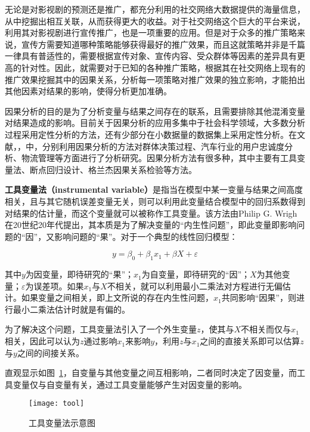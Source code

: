 无论是对影视剧的预测还是推广，都充分利用的社交网络大数据提供的海量信息，从中挖掘出相互关联，从而获得更大的收益。对于社交网络这个巨大的平台来说，利用其对影视剧进行宣传推广，也是一项重要的应用。但是对于众多的推广策略来说，宣传方需要知道哪种策略能够获得最好的推广效果，而且这就策略并非是千篇一律具有普适性的，需要根据宣传对象、宣传内容、受众群体等因素的差异具有更高的针对性。因此，就需要对于已知的各种推广策略，根据其在社交网络上现有的推广效果挖掘其中的因果关系，分析每一项策略对推广效果的独立影响，才能拍出其他因素对结果的影响，使得分析更加准确。

因果分析的目的是为了分析变量与结果之间存在的联系，且需要排除其他混淆变量对结果造成的影响。目前关于因果分析的应用多集中于社会科学领域，大多数分析过程采用定性分析的方法，还有少部分在小数据量的数据集上采用定性分析。在文献\cite{lin2008causal}，\cite{bauer1997method}，\cite{giessmann2010complexity}中，分别利用因果分析的方法对群体决策过程、汽车行业的用户忠诚度分析、物流管理等方面进行了分析研究。因果分析方法有很多种，其中主要有工具变量法、断点回归设计、格兰杰因果关系检验等方法。


\textbf{工具变量法（instrumental variable）}是指当在模型中某一变量与结果之间高度相关，且与其它随机误差变量无关，则可以利用此变量结合模型中的回归系数得到对结果的估计量，而这个变量就可以被称作工具变量\cite{工具}。该方法由Philip G. Wrigh在20世纪20年代提出\cite{stock2003retrospectives}，其本质是为了解决变量的“内生性问题”，即此变量即影响问题的“因”，又影响问题的“果”\cite{陈云松2012逻辑}。对于一个典型的线性回归模型：

\begin{equation}
y = \beta_0 + \beta_1x_1 + \beta X +  \varepsilon
\end{equation}

其中$y$为因变量，即待研究的“果”；$x_1$为自变量，即待研究的“因”；$X$为其他变量；$\varepsilon$为误差项。如果$x_1$与$X$不相关，就可以利用最小二乘法对方程进行无偏估计。如果变量之间相关，即上文所说的存在内生性问题，$x_1$共同影响“因果”，则进行最小二乘法估计时就是有偏的。

为了解决这个问题，工具变量法引入了一个外生变量$z$，使其与$X$不相关而仅与$x_1$相关，因此可以认为$z$通过影响$x_1$来影响$y$，利用$z$与$x_1$之间的直接关系即可以估算$z$与$y$之间的间接关系\cite{陈云松2012逻辑}。

直观显示如图~\ref{tool}，自变量与其他变量之间互相影响，二者同时决定了因变量，而工具变量仅与自变量有关，通过工具变量能够产生对因变量的影响。

\begin{figure}[h] 
  \centering
  \texttt{[image: tool]}
  \caption{工具变量法示意图}
    \label{tool}
\end{figure}

